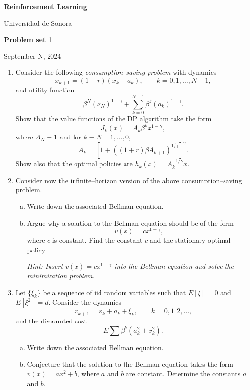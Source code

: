 \documentclass[a4paper,12pt]{article}
\begin{document}
  
\begin{center}
\vspace{-1cm}
{\large\bf 
Reinforcement Learning
}

Universidad de Sonora
\end{center}

\begin{center}\textbf{
Problem set 1}
\end{center}

 September N,  2024

\begin{enumerate}[1.]
\item Consider the following \textit{consumption--saving problem} with dynamics
	\[ x_{k+1} = (1+r)(x_k-a_k),\qquad k=0,1,\ldots,N-1, \]
and utility function
		\[  \beta^N(x_N)^{1-\gamma} + \sum_{k=0}^{N-1}\beta^k(a_k)^{1-\gamma}. \]
Show that the value functions of the DP algorithm take the form 
$$J_k(x)=A_k\beta^kx^{1-\gamma},$$ 
where $A_N=1$ and for $k=N-1,\ldots,0$,
	\[  A_k = [1 + ((1+r)\beta A_{k+1})^{1/\gamma} ]^\gamma.  \] 		
Show also that the optimal policies are $h_k(x)=A_k^{-1/\gamma} x$.%

\item Consider now the infinite--horizon version of the above consumption--saving problem. 
	\begin{enumerate}[(a)]
	\item Write down the associated Bellman equation.
	\item Argue why a solution to the Bellman equation should be of the form $$v(x)=cx^{1-\gamma},$$ where $c$ is constant. Find the constant $c$ and the stationary optimal policy.   
	 
	 
\hfill{\footnotesize\it  Hint: Insert $v(x)=cx^{1-\gamma}$ into the Bellman equation and solve the minimization problem.}
	\end{enumerate}

\item Let $\{\xi_k\}$ be a sequence of iid random variables such that $E[\xi]=0$ and $E[\xi^2]=d$. Consider the dynamics
	\[ x_{k+1} = x_k + a_k + \xi_k,\qquad k= 0,1,2,\ldots, \]
and the discounted cost
	\[  E \sum \beta^k(a_k^2+x_k^2).  \]
	\begin{enumerate}[(a)]
	\item Write down the associated Bellman equation.
	\item Conjecture that the solution to the Bellman equation takes the form $v(x)=ax^2+b$, where $a$ and $b$ are constant. Determine the constants $a$ and $b$.
	\end{enumerate}

	




\end{enumerate}
\end{document}
